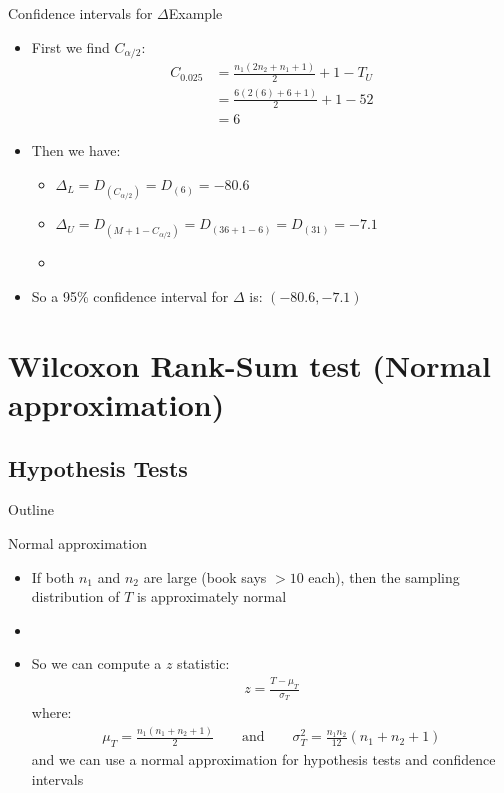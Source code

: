 \documentclass[xcolor=dvipsnames]{beamer}
\begin{document}
\begin{frame}{Confidence intervals for $\Delta$}{Example}
	\begin{itemize}
		\item First we find $C_{\alpha/2}$: \pause
		\begin{align*}
		C_{0.025} &= \frac{n_1 (2n_2 + n_1 + 1)}{2} + 1 - T_U \\
		&= \frac{6 (2(6) + 6 + 1)}{2} + 1 - 52 \\
		&= 6
		\end{align*}
		\item Then we have: \pause
		\begin{itemize}
			\item $\Delta_L = D_{(C_{\alpha / 2})} = D_{(6)} = -80.6$ \pause
			\item $\Delta_U = D_{(M + 1 - C_{\alpha / 2})} = D_{(36 +1 - 6)} =D_{(31)} = -7.1$ \pause
			\item[]
		\end{itemize}
	\item So a 95\% confidence interval for $\Delta$ is: $(-80.6, -7.1)$
	\end{itemize}
\end{frame}

\section{Wilcoxon Rank-Sum test (Normal approximation)}
\subsection{Hypothesis Tests}
\begin{frame}{Outline}
\tableofcontents[currentsection,subsectionstyle=show/shaded/hide]
\end{frame}

\begin{frame}{Normal approximation}
	\begin{itemize}
		\item If both $n_1$ and $n_2$ are large (book says $>10$ each), then the sampling distribution of $T$ is approximately normal \pause
		\item[]
		\item So we can compute a $z$ statistic: \pause
		\begin{gather*}
		z = \frac{T- \mu_T}{\sigma_T} 
		\end{gather*}
		where:
		\begin{gather*}
		\mu_T = \frac{n_1 (n_1 + n_2 + 1)}{2} \quad \quad \text{and} \quad \quad \sigma_T^{2} = \frac{n_1 n_2}{12}(n_1 +n_2 +1)
		\end{gather*} \pause
		and we can use a normal approximation for hypothesis tests and confidence intervals
	\end{itemize}
\end{frame}
\end{document}
